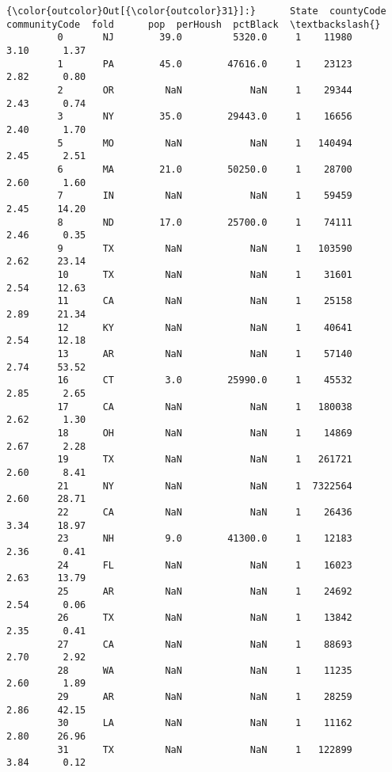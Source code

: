 \documentclass[11pt]{llncs}
\begin{document}
\begin{Verbatim}[commandchars=\\\{\}]
{\color{outcolor}Out[{\color{outcolor}31}]:}      State  countyCode  communityCode  fold      pop  perHoush  pctBlack  \textbackslash{}
         0       NJ        39.0         5320.0     1    11980      3.10      1.37   
         1       PA        45.0        47616.0     1    23123      2.82      0.80   
         2       OR         NaN            NaN     1    29344      2.43      0.74   
         3       NY        35.0        29443.0     1    16656      2.40      1.70   
         5       MO         NaN            NaN     1   140494      2.45      2.51   
         6       MA        21.0        50250.0     1    28700      2.60      1.60   
         7       IN         NaN            NaN     1    59459      2.45     14.20   
         8       ND        17.0        25700.0     1    74111      2.46      0.35   
         9       TX         NaN            NaN     1   103590      2.62     23.14   
         10      TX         NaN            NaN     1    31601      2.54     12.63   
         11      CA         NaN            NaN     1    25158      2.89     21.34   
         12      KY         NaN            NaN     1    40641      2.54     12.18   
         13      AR         NaN            NaN     1    57140      2.74     53.52   
         16      CT         3.0        25990.0     1    45532      2.85      2.65   
         17      CA         NaN            NaN     1   180038      2.62      1.30   
         18      OH         NaN            NaN     1    14869      2.67      2.28   
         19      TX         NaN            NaN     1   261721      2.60      8.41   
         21      NY         NaN            NaN     1  7322564      2.60     28.71   
         22      CA         NaN            NaN     1    26436      3.34     18.97   
         23      NH         9.0        41300.0     1    12183      2.36      0.41   
         24      FL         NaN            NaN     1    16023      2.63     13.79   
         25      AR         NaN            NaN     1    24692      2.54      0.06   
         26      TX         NaN            NaN     1    13842      2.35      0.41   
         27      CA         NaN            NaN     1    88693      2.70      2.92   
         28      WA         NaN            NaN     1    11235      2.60      1.89   
         29      AR         NaN            NaN     1    28259      2.86     42.15   
         30      LA         NaN            NaN     1    11162      2.80     26.96   
         31      TX         NaN            NaN     1   122899      3.84      0.12   

\end{Verbatim}
\end{document}
